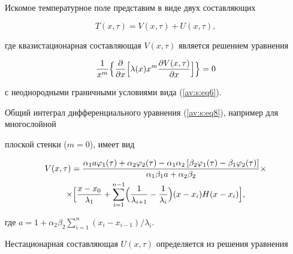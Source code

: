Искомое температурное поле представим в виде двух составляющих

\begin{equation}

\label{av:s:eq7}

T(x,\tau )=V(x,\tau )+U(x,\tau ),

\end{equation}

где квазистационарная составляющая $V(x,\tau )$ является решением уравнения

\begin{equation}

\label{av:s:eq8}

\frac{1}{x^m}\Bigl\{

\frac{\partial }{\partial x}\Bigl[ \lambda(x)x^m\frac{\partial V(x,\tau )}{\partial x}  \Bigr] \Bigr\}=0

\end{equation}

с неоднородными граничными условиями вида (\ref{av:s:eq6}).



Общий интеграл дифференциального уравнения (\ref{av:s:eq8}), например для многослойной

плоской стенки ($m= 0$), имеет вид

\begin{multline*}

\label{av:s:eq9}

V(x,\tau )=\frac{\alpha _1 a\varphi _1 (\tau )+\alpha _2 \varphi _2 (\tau

)-\alpha _1 \alpha _2 \left[ {\beta _2 \varphi _1 (\tau )-\beta _1 \varphi

_2 (\tau )} \right]}{\alpha _1 \beta _1 a+\alpha _2 \beta _2 }

\times \\

\times

\Bigl[

\frac{x-x_0 }{\lambda _1 }+\sum\limits_{i=1}^{n-1} \Bigl(

{\frac{1}{\lambda _{i+1} }-\frac{1}{\lambda _i }} \Bigr) ( x-x_i )H(x-x_i) \Bigr],

\end{multline*}

где $a=1+\alpha _2 \beta _2 \sum\limits_{i=1}^n ({x_i -x_{i-1}})/{\lambda _i } $.



Нестационарная составляющая $U(x, \tau )$ определяется из решения уравнения

